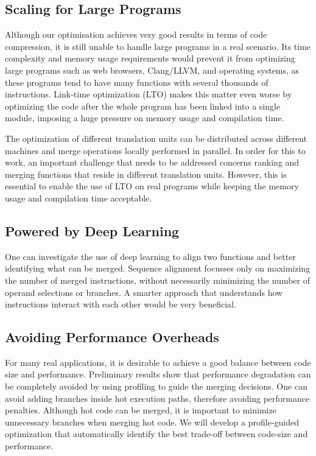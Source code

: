 \subsection{Scaling for Large Programs}

Although our optimisation achieves very good results in terms of code compression, it is still unable to handle large programs in a real scenario.
Its time complexity and memory usage requirements would prevent it from optimizing large programs such as web browsers, Clang/LLVM, and operating systems, as these programs tend to have many functions with several thousands of instructions.
Link-time optimization (LTO) makes this matter even worse by optimizing the code after the whole program has been linked into a single module, imposing a huge pressure on memory usage and compilation time.

The optimization of different translation units can be distributed across different machines and merge operations locally performed in parallel.
In order for this to work, an important challenge that needs to be addressed concerns ranking and merging functions that reside in different translation units.
However, this is essential to enable the use of LTO on real programs while keeping the memory usage and compilation time acceptable.

\subsection{Powered by Deep Learning}

One can investigate the use of deep learning to align two functions and better identifying what can be merged.
Sequence alignment focusses only on maximizing the number of merged instructions,
without necessarily minimizing the number of operand selections or branches.
A smarter approach that understands how instructions interact with each other would be
very beneficial.

\subsection{Avoiding Performance Overheads}

For many real applications, it is desirable to achieve a good balance between code size and performance.
Preliminary results show that performance degradation can be completely avoided by using profiling to
guide the merging decisions.
One can avoid adding branches inside hot execution paths, therefore avoiding performance penalties.
Although hot code can be merged, it is important to minimize unnecessary branches when merging hot code.
We will develop a profile-guided optimization that automatically identify the best trade-off between code-size and performance.

